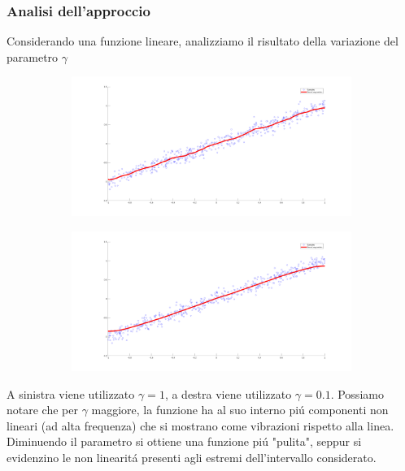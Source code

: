 \documentclass[12pt]{article}
\begin{document}
\subsubsection{Analisi dell'approccio}
Considerando una funzione lineare, analizziamo il risultato della variazione
del parametro $\gamma$
\begin{figure}[H]
  \centering
  \begin{subfigure}{0.45\textwidth}
    \includegraphics[width=\textwidth]{images/KernelRegressionLineBigGamma}
  \end{subfigure}
  \begin{subfigure}{0.45\textwidth}
    \includegraphics[width=\textwidth]{images/KernelRegressionLineSmallGamma}
  \end{subfigure}
\end{figure}
A sinistra viene utilizzato $\gamma = 1$, a destra viene utilizzato $\gamma = 0.1$.
Possiamo notare che per $\gamma$ maggiore, la funzione ha al suo interno piú componenti
non lineari (ad alta frequenza) che si mostrano come vibrazioni rispetto alla linea. \\
Diminuendo il parametro si ottiene una funzione piú "pulita", seppur si evidenzino le non linearitá presenti
agli estremi dell'intervallo considerato. \\
\end{document}
